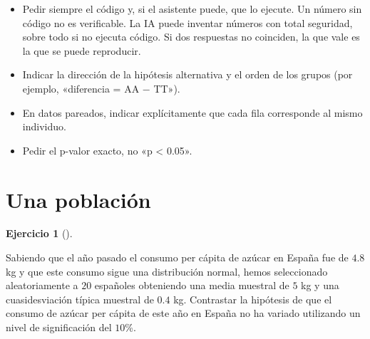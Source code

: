 \documentclass[
  spanish,
  a4paper,
]{scrreport}
\theoremstyle{definition}
\newtheorem{exercise}{Ejercicio}[chapter]
\theoremstyle{remark}
\begin{document}
\begin{tcolorbox}
\begin{itemize}
\begin{verbatim}
Tengo estos datos (CSV adjunto). Quiero contrastar H0: μ = 5 frente a H1: μ > 5
con una t de Student para una muestra, α = 0.05.
1. Calcula n, media, desviación típica, mínimo y máximo.
2. Comprueba la normalidad con Shapiro-Wilk.
3. Haz el contraste: estadístico, grados de libertad, p-valor e IC del 95 %.
4. Muestra el código R que has ejecutado para obtenerlo.
\end{verbatim}
\item
  Pedir siempre el código y, si el asistente puede, que lo ejecute. Un
  número sin código no es verificable. La IA puede inventar números con
  total seguridad, sobre todo si no ejecuta código. Si dos respuestas no
  coinciden, la que vale es la que se puede reproducir.
\item
  Indicar la dirección de la hipótesis alternativa y el orden de los
  grupos (por ejemplo, «diferencia = AA − TT»).
\item
  En datos pareados, indicar explícitamente que cada fila corresponde al
  mismo individuo.
\item
  Pedir el p-valor exacto, no «p \textless{} 0.05».
\end{itemize}

\end{tcolorbox}

\section{Una población}\label{una-poblaciuxf3n}

\begin{exercise}[]\protect\hypertarget{exr-contraste-media-consumo-azucar}{}\label{exr-contraste-media-consumo-azucar}

Sabiendo que el año pasado el consumo per cápita de azúcar en España fue
de \(4.8\) kg y que este consumo sigue una distribución normal, hemos
seleccionado aleatoriamente a \(20\) españoles obteniendo una media
muestral de \(5\) kg y una cuasidesviación típica muestral de \(0.4\)
kg. Contrastar la hipótesis de que el consumo de azúcar per cápita de
este año en España no ha variado utilizando un nivel de significación
del \(10\)\%.

\end{exercise}
\end{document}
